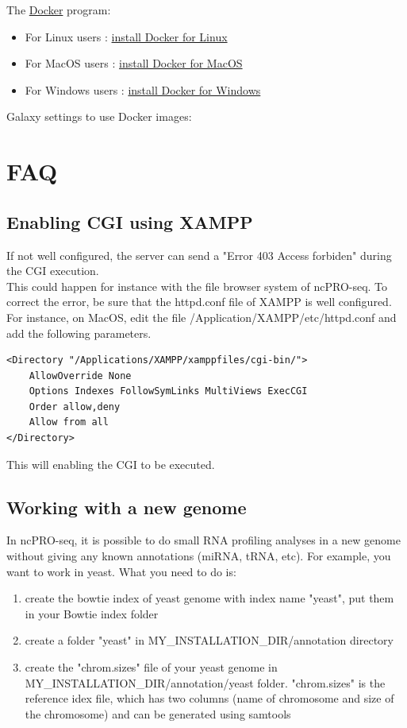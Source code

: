 \documentclass[12pt]{article}
\def \ncpip{ncPRO-seq}
\begin{document}
 \item The \href{https://www.docker.com}{ Docker} program:
 
\begin{itemize}
 \item For Linux users : \href{https://docs.docker.com/linux/step_one}{install Docker for Linux}
 \item For MacOS users : \href{https://docs.docker.com/mac/step_one}{install Docker for MacOS}
 \item For Windows users : \href{https://docs.docker.com/windows/step_one}{install Docker for Windows}
\end{itemize}

 \item Galaxy settings to use Docker images:

\section{FAQ}
\subsection{Enabling CGI using XAMPP}
If not well configured, the server can send a "Error 403 Access forbiden" during the CGI execution.\\
This could happen for instance with the file browser system of \ncpip{}. To correct the error, be sure that the httpd.conf file of XAMPP is well configured.
For instance, on MacOS, edit the file /Application/XAMPP/etc/httpd.conf and add the following parameters.
\begin{verbatim}
<Directory "/Applications/XAMPP/xamppfiles/cgi-bin/">
    AllowOverride None
    Options Indexes FollowSymLinks MultiViews ExecCGI
    Order allow,deny
    Allow from all
</Directory>
\end{verbatim}
This will enabling the CGI to be executed.

\subsection{Working with a new genome}

In \ncpip{}, it is possible to do small RNA profiling analyses in a new genome without giving any known annotations (miRNA, tRNA, etc). For example, you want to work in yeast. What you need to do is:
\begin{enumerate}
 \item create the bowtie index of yeast genome with index name "yeast", put them in your Bowtie index folder
 \item create a folder "yeast" in MY\_INSTALLATION\_DIR/annotation directory
 \item create the "chrom.sizes" file of your yeast genome in MY\_INSTALLATION\_DIR/annotation/yeast folder. "chrom.sizes" is the reference idex file, which has two columns (name of chromosome and size of the chromosome) and can be generated using samtools 
\end{enumerate}
\end{document}
